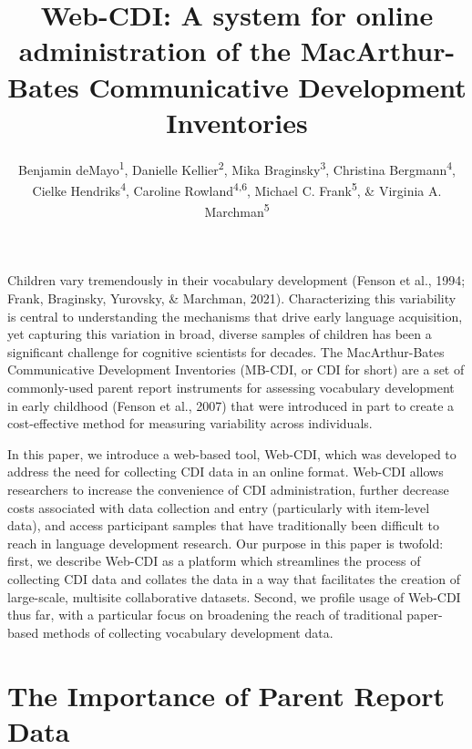 \documentclass[
  english,
  ,man,floatsintext]{apa6}
\title{Web-CDI: A system for online administration of the MacArthur-Bates Communicative Development Inventories}
\author{Benjamin deMayo\textsuperscript{1}, Danielle Kellier\textsuperscript{2}, Mika Braginsky\textsuperscript{3}, Christina Bergmann\textsuperscript{4}, Cielke Hendriks\textsuperscript{4}, Caroline Rowland\textsuperscript{4,6}, Michael C. Frank\textsuperscript{5}, \& Virginia A. Marchman\textsuperscript{5}}
\date{}
\affiliation{\vspace{0.5cm}\textsuperscript{1} Princeton University\\\textsuperscript{2} University of Pennsylvania\\\textsuperscript{3} Massachusetts Institute of Technology\\\textsuperscript{4} Max Planck Institute for Psycholinguistics\\\textsuperscript{5} Stanford University\\\textsuperscript{6} Radboud University}
\begin{document}
\maketitle

Children vary tremendously in their vocabulary development (Fenson et al., 1994; Frank, Braginsky, Yurovsky, \& Marchman, 2021). Characterizing this variability is central to understanding the mechanisms that drive early language acquisition, yet capturing this variation in broad, diverse samples of children has been a significant challenge for cognitive scientists for decades. The MacArthur-Bates Communicative Development Inventories (MB-CDI, or CDI for short) are a set of commonly-used parent report instruments for assessing vocabulary development in early childhood (Fenson et al., 2007) that were introduced in part to create a cost-effective method for measuring variability across individuals.

In this paper, we introduce a web-based tool, Web-CDI, which was developed to address the need for collecting CDI data in an online format. Web-CDI allows researchers to increase the convenience of CDI administration, further decrease costs associated with data collection and entry (particularly with item-level data), and access participant samples that have traditionally been difficult to reach in language development research. Our purpose in this paper is twofold: first, we describe Web-CDI as a platform which streamlines the process of collecting CDI data and collates the data in a way that facilitates the creation of large-scale, multisite collaborative datasets. Second, we profile usage of Web-CDI thus far, with a particular focus on broadening the reach of traditional paper-based methods of collecting vocabulary development data.

\hypertarget{the-importance-of-parent-report-data}{%
\section{The Importance of Parent Report Data}\label{the-importance-of-parent-report-data}}
\end{document}
